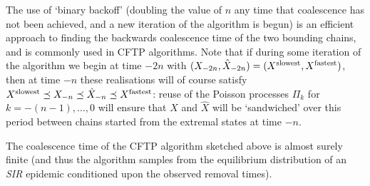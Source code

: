 \documentclass[]{article}
\newcommand{\Epi}{X}
\newcommand{\SIR}{\emph{SIR}\xspace}
\newcommand{\Poisson}{\Pi}
\newcommand{\faster}[1]{\hat{#1}}
\newcommand{\slower}[1]{#1}
\newcommand{\Slowest}[1][]{{}^{\textup{slowest}#1}}
\newcommand{\Fastest}[1][]{{}^{\textup{fastest}#1}}
\begin{document}
The use of `binary backoff' (doubling the value of \(n\) any time that coalescence has not been achieved, and a new iteration of the algorithm is begun) is an efficient approach to finding the backwards coalescence time of the two bounding chains, and is commonly used in CFTP algorithms. Note that if during some iteration of the algorithm we begin at time \(-2n\) with \((\slower\Epi_{-2n},\faster\Epi_{-2n}) = (\Epi\Slowest,\Epi\Fastest)\), then at time \(-n\) these realisations will of course satisfy \(\Epi\Slowest \preceq \slower\Epi_{-n} \preceq \faster\Epi_{-n} \preceq \Epi\Fastest\): reuse of the Poisson processes \(\Poisson_k\) for \(k=-(n-1),\dots,0\) will ensure that \(\slower\Epi\) and \(\faster\Epi\) will be `sandwiched' over this period between chains started from the extremal states at time \(-n\).


\begin{thm}\label{thm:CFTP_works}
	The coalescence time of the CFTP algorithm sketched above is almost surely finite (and thus the algorithm samples from the equilibrium distribution of an \SIR epidemic conditioned upon the observed removal times).
\end{thm}
\end{document}
